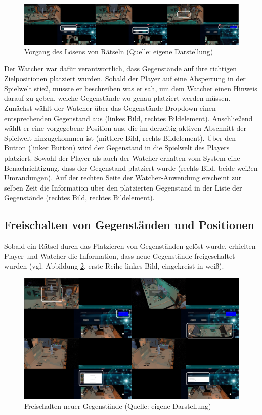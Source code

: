 \begin{figure}[ht]
\centering
\includegraphics[width=1\linewidth]{content/pictures/HowToSolve.png}
\caption{Vorgang des Lösens von Rätseln (Quelle: eigene Darstellung)}
\label{fig:old-solving-riddle}
\end{figure}

Der Watcher war dafür verantwortlich, dass Gegenstände auf ihre richtigen Zielpositionen platziert wurden. Sobald der Player auf eine Absperrung in der Spielwelt stieß, musste er beschreiben was er sah, um dem Watcher einen Hinweis darauf zu geben, welche Gegenstände wo genau platziert werden müssen. Zunächst wählt der Watcher über das Gegenstände-Dropdown einen entsprechenden Gegenstand aus (linkes Bild, rechtes Bildelement). Anschließend wählt er eine vorgegebene Position aus, die im derzeitig aktiven Abschnitt der Spielwelt hinzugekommen ist (mittlere Bild, rechts Bildelement). Über den Button  (linker Button) wird der Gegenstand in die Spielwelt des Players platziert. Sowohl der Player als auch der Watcher erhalten vom System eine Benachrichtigung, dass der Gegenstand platziert wurde (rechts Bild, beide weißen Umrandungen). Auf der rechten Seite der Watcher-Anwendung erscheint zur selben Zeit die Information über den  platzierten Gegenstand in der Liste der Gegenstände (rechtes Bild, rechtes Bildelement). 

\subsection{Freischalten von Gegenständen und Positionen}
Sobald ein Rätsel durch das Platzieren von Gegenständen gelöst wurde, erhielten Player und Watcher die Information, dass neue Gegenstände freigeschaltet wurden (vgl. Abbildung \ref{fig:old-unlock-system}, erste Reihe linkes Bild, eingekreist in weiß). 

\begin{figure}[ht]
\centering
\includegraphics[width=1\linewidth]{content/pictures/UnlockMore.png}
\caption{Freischalten neuer Gegenstände (Quelle: eigene Darstellung)}
\label{fig:old-unlock-system}
\end{figure}

